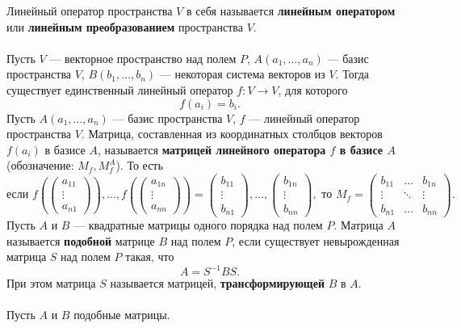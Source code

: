 \documentclass[a4paper, 12pt]{report}
\numberwithin{equation}{section}
\begin{document}
	{Линейный оператор пространства $V$ в себя называется \textbf{линейным оператором} или \textbf{линейным преобразованием} пространства $V$.}\\\\
	Пусть $V$ --- векторное пространство над полем $P$, $A(a_1,\ldots, a_n)$ --- базис пространства $V$, $B(b_1,\dots,b_n)$ --- некоторая система векторов из $V$. Тогда существует единственный линейный оператор $f:V\rightarrow V$, для которого $$f(a_i) = b_i.$$
	{Пусть $A(a_1,\ldots,a_n)$ --- базис пространства $V$, $f$ --- линейный оператор пространства $V$. Матрица, составленная из координатных столбцов векторов $f(a_i)$ в базисе $A$, называется \textbf{матрицей линейного оператора $f$ в базисе $A$} (обозначение: $M_f, M_f^A$). То есть
		$$\text{если }f(\begin{pmatrix}
			a_{11} \\ \vdots \\ a_{n1} 
		\end{pmatrix}),\ldots, f(\begin{pmatrix}
			a_{1n} \\ \vdots \\ a_{nn} 
		\end{pmatrix}) = \begin{pmatrix}
			b_{11} \\ \vdots \\ b_{n1} 
		\end{pmatrix},\ldots, \begin{pmatrix}
			b_{1n} \\ \vdots \\ b_{nn} 
		\end{pmatrix}, \text{ то } M_f = \begin{pmatrix}
			b_{11} & \ldots & b_{1n} \\ 
			\vdots & \ddots & \vdots \\
			b_{n1} & \ldots & b_{nn}
		\end{pmatrix}.$$}
	{Пусть $A$ и $B$ --- квадратные матрицы одного порядка над полем $P$. Матрица $A$ называется \textbf{подобной} матрице $B$ над полем $P$, если существует невырожденная матрица $S$ над полем $P$ такая, что 
		\begin{equation*}
			A = S^{-1}BS.
		\end{equation*} 
		При этом матрица $S$ называется матрицей, \textbf{трансформирующей} $B$ в $A$.}\\\\
	Пусть $A$ и $B$ подобные матрицы.
	\\\\
\end{document}
